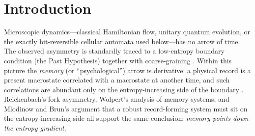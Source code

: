 \documentclass[aps,pre,twocolumn,superscriptaddress,nofootinbib,longbibliography]{revtex4-2}
\newcommand{\tS}{t_{\mathrm{S}}}
\newcommand{\tstar}{t^{*}}
\begin{document}
\begin{abstract}
scrambling rates---and records are stored redundantly,
with effective redundancy growing as $N^{\alpha}$, $\alpha_\infty=0.92\pm0.04$
(conservative) classically and $\alpha=1$ for quantum broadcast states. Finally, the
horizon needs no external analyst: an \emph{endogenous} one-bit observer---a reversible
Maxwell demon whose sensor is fixed at the boundary and never retrained, writing to blank
tape by reversible \textsc{cnot}, erasures counted at the Landauer bound---sees the same
horizon ($\tstar_{\mathrm{demon}}=0.95\,\tS$ on the lattice, $0.54\,\tS$ in the gas),
cannot learn in equilibrium ($0.02$ bit), and its best recall decays with the record's own
mode: durable memory is bought only with blank tape spent before the record has relaxed.
These results quantify the sense in which the recorded past is the direction of the entropy
gradient---while leaving the low-entropy boundary itself unexplained.
\end{abstract}

\maketitle

\section{Introduction}
\label{sec:intro}

Microscopic dynamics---classical Hamiltonian flow, unitary quantum evolution, or the exactly
bit-reversible cellular automata used below---has no arrow of time. The observed asymmetry is
standardly traced to a low-entropy boundary condition (the Past Hypothesis) together with
coarse-graining \cite{boltzmann1877,lebowitz1993,albert2000,price1996,penrose1979}. Within
this picture the \emph{memory} (or ``psychological'') arrow is derivative: a physical record
is a present macrostate correlated with a macrostate at another time, and such correlations
are abundant only on the entropy-increasing side of the boundary
\cite{reichenbach1956,wolpert1992,mlodinowbrun2014,rovelli2020memory,halliwell1999,gellmannhartle1993}.
Reichenbach's fork asymmetry, Wolpert's analysis of memory systems, and Mlodinow and Brun's
argument that a robust record-forming system must sit on the entropy-increasing side all
support the same conclusion: \emph{memory points down the entropy gradient}.
\end{document}
